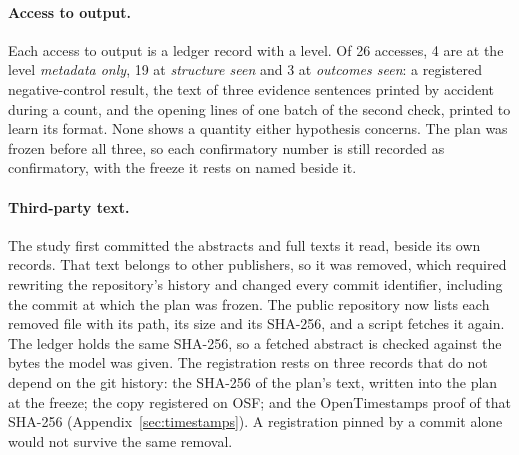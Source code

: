 \paragraph{Access to output.} Each access to output is a ledger record with a level. Of 26
accesses, 4 are at the level \emph{metadata only}, 19 at \emph{structure seen} and 3 at
\emph{outcomes seen}: a registered negative-control result, the text of three evidence
sentences printed by accident during a count, and the opening lines of one batch of the second
check, printed to learn its format. None shows a quantity either hypothesis concerns.
The plan was frozen before all three, so each confirmatory number is still recorded as confirmatory,
with the freeze it rests on named beside it.

\paragraph{Third-party text.} The study first committed the abstracts and full texts it read,
beside its own records. That text belongs to other publishers, so it was removed, which required
rewriting the repository's history and changed every commit identifier, including the commit at
which the plan was frozen. The public repository now lists each removed file with its path, its
size and its SHA-256, and a script fetches it again. The ledger holds the same SHA-256, so a
fetched abstract is checked against the bytes the model was given. The registration rests on three
records that do not depend on the git history: the SHA-256 of the plan's text, written into the
plan at the freeze; the copy registered on OSF; and the OpenTimestamps proof of that SHA-256
\citep{todd2016opentimestamps} (Appendix~\ref{sec:timestamps}). A registration pinned by a commit
alone would not survive the same removal.
